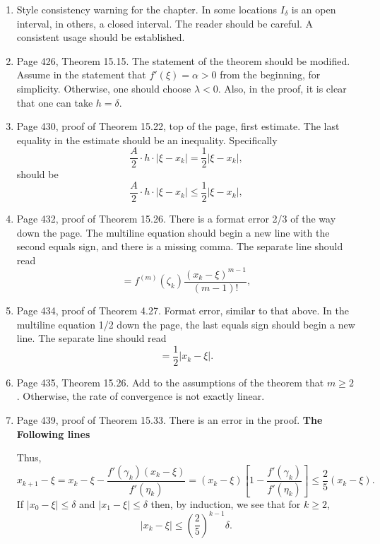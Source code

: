 \documentclass{book}
\begin{document}
	\begin{enumerate}
	
	\item
Style consistency warning for the chapter. In some locations $I_\delta$ is an open interval, in others, a closed interval. The reader should be careful. A consistent usage should be established.

	\item
Page 426, Theorem 15.15. The statement of the theorem should be modified. Assume in the statement that $f'(\xi) =\alpha >0$ from the beginning, for simplicity. Otherwise, one should choose $\lambda<0$. Also, in the proof, it is clear that one can take $h = \delta$.
	
	\item
Page 430, proof of Theorem 15.22, top of the page, first estimate. The last equality in the estimate should be an inequality. Specifically
	\[
\frac{A}{2}\cdot h\cdot |\xi-x_k| = \frac{1}{2} |\xi-x_k|,
	\]
should be 	
	\[
\frac{A}{2}\cdot h\cdot |\xi-x_k| \le  \frac{1}{2} |\xi-x_k|,
	\]

	\item
Page 432, proof of Theorem 15.26. There is a format error 2/3 of the way down the page. The multiline equation should begin a new line with the second equals sign, and there is a missing comma. The separate line should read
	\[
 = f^{(m)}(\zeta_k)\frac{(x_k-\xi)^{m-1}}{(m-1)!},
	\]
	
	\item
Page 434, proof of Theorem 4.27. Format error, similar to that above. In the multiline equation 1/2 down the page, the last equals sign should begin a new line. The separate line should read
	\[
= \frac{1}{2}|x_k-\xi|.	
	\]
	
	\item
Page 435, Theorem 15.26. Add to the assumptions of the theorem that $m\ge 2$. Otherwise, the rate of convergence is not exactly linear.

	\item
Page 439, proof of Theorem 15.33. There is an error in the proof. \textbf{The Following lines} 

	\medskip
	
Thus,
\[
  x_{k+1} -\xi = x_k - \xi -\frac{f'(\gamma_k) (x_k-\xi)}{f'(\eta_k)} = (x_k-\xi)\left[1 - \frac{f'(\gamma_k)}{f'(\eta_k)}\right] \le \frac{2}{5}(x_k-\xi).
\]
If $|x_0-\xi| \le \delta$ and $|x_1-\xi| \le \delta$ then, by induction, we see that for $k\ge 2$,
\[
  |x_k-\xi| \le \left( \frac{2}{5}\right)^{k-1} \delta .
\]


\end{enumerate}
\end{document}
